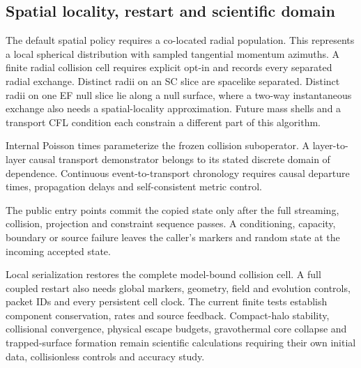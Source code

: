 \subsection{Spatial locality, restart and scientific domain}

The default spatial policy requires a co-located radial population. This
represents a local spherical distribution with sampled tangential momentum
azimuths. A finite radial collision cell requires explicit opt-in and
records every separated radial exchange. Distinct radii on an SC slice
are spacelike separated. Distinct radii on one EF null slice lie along a
null surface, where a two-way instantaneous exchange also needs a
spatial-locality approximation. Future mass shells and a transport CFL
condition each constrain a different part of this algorithm.

Internal Poisson times parameterize the frozen collision suboperator.
A layer-to-layer causal transport demonstrator belongs to its stated
discrete domain of dependence. Continuous event-to-transport chronology
requires causal departure times, propagation delays and self-consistent
metric control.

The public entry points commit the copied state only after the full
streaming, collision, projection and constraint sequence passes. A
conditioning, capacity, boundary or source failure leaves the caller's
markers and random state at the incoming accepted state.

Local serialization restores the complete model-bound collision cell.
A full coupled restart also needs global markers, geometry, field and
evolution controls, packet IDs and every persistent cell clock. The
current finite tests establish component conservation, rates and source
feedback. Compact-halo stability, collisional convergence, physical
escape budgets, gravothermal core collapse and trapped-surface formation
remain scientific calculations requiring their own initial data,
collisionless controls and accuracy study.
